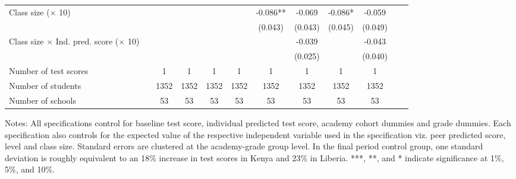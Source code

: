 \begin{center}
\begin{scriptsize}
\begin{threeparttable}
\begin{tabular} {@{} l l c c c c c c c c c c  @{}}
Class size ($\times$ 10) &  &  &  &  &  & -0.086** & -0.069 & -0.086* & -0.059 \\
                 &  &  &  &  &  & (0.043) & (0.043) & (0.045) & (0.049) \\
Class size $\times$ Ind. pred. score ($\times$ 10) &  &  &  &  &  &  & -0.039 &  & -0.043 \\
                 &  &  &  &  &  &  & (0.025) &  & (0.040) \\
\midrule
Number of test scores &  & 1 & 1 & 1 & 1 & 1 & 1 & 1 & 1 \\
Number of students &  & 1352 & 1352 & 1352 & 1352 & 1352 & 1352 & 1352 & 1352 \\
Number of schools &  & 53 & 53 & 53 & 53 & 53 & 53 & 53 & 53 \\
\bottomrule
\end{tabular}
\begin{tablenotes}
\item Notes: All specifications control for baseline test score, individual predicted test score, academy cohort dummies and grade dummies. Each specification also controls for the expected value of the respective independent variable used in the specification viz. peer predicted score, level and class size. Standard errors are clustered at the academy-grade group level. In the final period control group, one standard deviation is roughly equivalent to an 18\% increase in test scores in Kenya and 23\% in Liberia. ***, **, and * indicate significance at 1\%, 5\%, and 10\%.\end{tablenotes}
\end{threeparttable}
\end{scriptsize}
\end{center}
\clearpage
